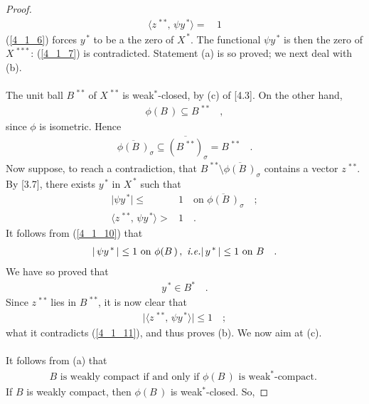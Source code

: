 \begin{proof}
\begin{align}
\label{4_1_7} \langle z^{\,\ast\ast},\, \psi y^{\,\ast} \rangle=&\,1
\end{align}
(\ref{4_1_6}) forces $y^{\,\ast}$ to be a the zero of $X^{\,\ast}$. The functional $\psi y^{\,\ast}$ is then the zero of $X^{\,\ast\ast\ast}$: (\ref{4_1_7}) is contradicted. Statement (a) is so proved; we next deal with (b).\\
\\
The unit ball $B^{\,\ast\ast}$ of $X^{\,\ast\ast}$ is weak$^\ast$-closed, by (c) of [4.3]. On the other hand,
\begin{align}
\phi(B\,)\subseteq  B^{\,\ast\ast}\quad ,
\end{align}
since $\phi$ is isometric. Hence
\begin{align}
\overline{\phi(B\,)}_\sigma\subseteq \overline{ (B^{\,\ast\ast})}_\sigma=  B^{\,\ast\ast}\quad .
\end{align}
Now suppose, to reach a contradiction, that $B^{\,\ast\ast}\setminus \overline{\phi(B\,)}_\sigma$ contains a vector $z^{\,\ast\ast}$. By [3.7], there exists $y^{\,\ast}$ in $X^{\,\ast}$ such that 
\begin{align}
 \label{4_1_10} \lvert \psi y^{\,\ast}  \rvert \leq &1 \quad  \text{on}\,\,\overline{\phi(B\,)}_\sigma \quad  ; \\
   \label{4_1_11}  \langle z^{\,\ast\ast},\, \psi y^{\,\ast} \rangle > &1\quad .
\end{align}
It follows from (\ref{4_1_10}) that 
\begin{align}
\lvert \, \psi y^{\,\ast}\,   \rvert \leq 1 \text{  on }\phi(B\,)\, , \, \, \textit{i.e.} \lvert\, y^{\,\ast}  \, \rvert \leq 1  \text{  on } B\quad .
\end{align}
We have so proved that 
\begin{align}
y^{\,\ast} \in B^\ast \quad .
\end{align}
Since $ z^{\,\ast\ast}$ lies in $B^{\,\ast\ast}$, it is now clear that 
\begin{align}
\lvert \langle z^{\,\ast\ast},\,  \psi y^{\,\ast} \rangle\rvert \leq 1\quad; 
\end{align}
what it contradicts (\ref{4_1_11}), and thus proves (b). We now aim at (c).\\
\\
It follows from (a) that
\begin{align}\label{4_15}
B\text{ is weakly compact if and only if }\phi(B\,) \text{ is weak}^\ast\text{-compact. }
\end{align}
If $B$ is weakly compact, then $\phi(B\,)$ is weak$^\ast$-closed. So,

\end{proof}
